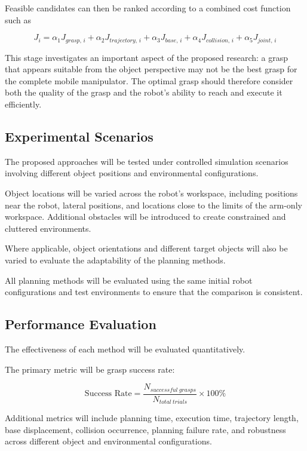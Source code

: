 \documentclass[12pt,a4paper]{article}
\begin{document}
Feasible candidates can then be ranked according to a combined cost function such as

\begin{equation}
J_i = \alpha_1 J_{grasp,\,i} + \alpha_2 J_{trajectory,\,i} + \alpha_3 J_{base,\,i}
      + \alpha_4 J_{collision,\,i} + \alpha_5 J_{joint,\,i}
\end{equation}

This stage investigates an important aspect of the proposed research: a grasp that appears
suitable from the object perspective may not be the best grasp for the complete mobile
manipulator. The optimal grasp should therefore consider both the quality of the grasp and the
robot's ability to reach and execute it efficiently.

\subsection*{Experimental Scenarios}

The proposed approaches will be tested under controlled simulation scenarios involving
different object positions and environmental configurations.

Object locations will be varied across the robot's workspace, including positions near the robot,
lateral positions, and locations close to the limits of the arm-only workspace. Additional
obstacles will be introduced to create constrained and cluttered environments.

Where applicable, object orientations and different target objects will also be varied to evaluate
the adaptability of the planning methods.

All planning methods will be evaluated using the same initial robot configurations and test
environments to ensure that the comparison is consistent.

\subsection*{Performance Evaluation}

The effectiveness of each method will be evaluated quantitatively.

The primary metric will be grasp success rate:

\begin{equation}
\text{Success Rate} = \frac{N_{successful\ grasps}}{N_{total\ trials}} \times 100\%
\end{equation}

Additional metrics will include planning time, execution time, trajectory length, base
displacement, collision occurrence, planning failure rate, and robustness across different object
and environmental configurations.
\end{document}
